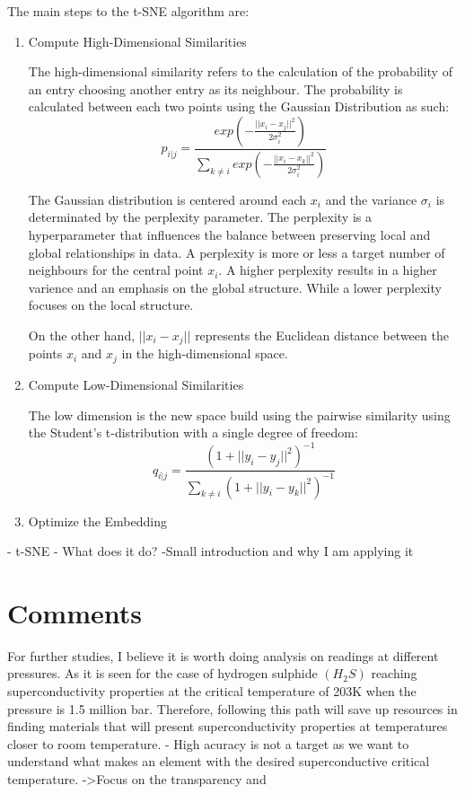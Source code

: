 \documentclass{article}\usepackage[]{graphicx}\usepackage[]{xcolor}
\begin{document}
The main steps to the t-SNE algorithm are:

\begin{enumerate}
    \item Compute High-Dimensional Similarities
    
        The high-dimensional similarity refers to the calculation of the probability of an entry choosing another entry as its neighbour. The probability is calculated between each two points using the Gaussian Distribution as such:
        $$p_{i|j} = \frac{exp(-\frac{||x_i - x_j||^2}{2\sigma_i^2})}{\sum_{k \neq i} exp(- \frac{||x_i - x_k||^2}{2\sigma_i^2})}$$

        The Gaussian distribution is centered around each $x_i$ and the variance $\sigma_i$ is determinated by the perplexity parameter. The perplexity is a hyperparameter that influences the balance between preserving local and global relationships in data. A perplexity is more or less a target number of neighbours for the central point $x_i$. A higher perplexity results in a higher varience and an emphasis on the global structure. While a lower perplexity focuses on the local structure.
        
        On the other hand, $||x_i - x_j||$ represents the Euclidean distance between the points $x_i$ and $x_j$ in the high-dimensional space.

    \item Compute Low-Dimensional Similarities
    
        The low dimension is the new space build using the pairwise similarity using the Student's t-distribution with a single degree of freedom:
        $$q_{i|j} = \frac{(1 + ||y_i - y_j||^2)^{-1}}{\sum_{k \neq i} (1 + ||y_i - y_k||^2)^{-1}}$$

        

    \item Optimize the Embedding
\end{enumerate}


 
- t-SNE - What does it do?
-Small introduction and why I am applying it

\section{Comments}
For further studies, I believe it is worth doing analysis on readings at different pressures. As it is seen for the case of hydrogen sulphide $(H_2S)$ reaching superconductivity properties at the critical temperature of 203K when the pressure is 1.5 million bar. Therefore, following this path will save up resources in finding materials that will present superconductivity properties at temperatures closer to room temperature.
- High acuracy is not a target as we want to understand what makes an element with the desired superconductive critical temperature. -\textgreater Focus on the transparency and 
\end{document}
